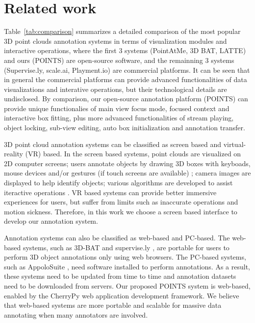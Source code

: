 \documentclass[letterpaper, 10 pt, conference]{ieeeconf}  %
\begin{document}
\section{Related work}
\label{sec:realtedwork}



Table~\ref{tab:comparison} summarizes a detailed comparison of the most popular 3D point clouds annotation systems in terms of visualization modules and interactive operations, where the first 3 systems (PointAtMe\cite{pointatme}, 3D BAT\cite{Zimmer20193DBA}, LATTE\cite{Wang2019LATTEAL}) and ours (POINTS) are open-source software, 
and the remainning 3 systems (Supervise.ly\cite{SUPERVISELY}, scale.ai\cite{scale}, Playment.io\cite{Playment}) are commercial platforms. 
It can be seen that in general the commercial platforms can provide advanced functionalities of data visualizations and interative operations, 
but their technological details are undisclosed. 
By comparison, our open-source annotation platform (POINTS) can provide unique functionalies of main view focus mode, focused context and interactive box fitting, plus more advanced functionalities of stream playing, object locking, sub-view editing, auto box initialization and annotation transfer.

3D point cloud annotation systems can be classified as screen based and virtual-reality (VR) based. 
In the screen based systems, point clouds are visualized on 2D computer screens; users annotate objects by drawing 3D boxes with
keyboads, mouse devices and/or gestures (if touch screens are available) \cite{LabelMe3D}; camera images are displayed to help identify objects; various algorithms are developed to assist iteractive operations \cite{Wang2019LATTEAL}. 
VR based systems can provide better immersive experiences for users\cite{pointatme, gothentag}, but suffer from limits such as inaccurate operations and motion sickness. 
Therefore, in this work we choose a screen based interface to develop our annotation system.

Annotation systems can also be classified as web-based and PC-based. 
The web-based systems, such as 3D-BAT\cite{Zimmer20193DBA} and supervise.ly \cite{SUPERVISELY}, are portable for users to perform 3D object annotations only using web browsers. 
The PC-based systems, such as AppoloSuite \cite{wang2019apolloscape}, need software installed to perform annotations. 
As a result, these systems need to be updated from time to time and annotation datasets need to be downloaded from servers. 
Our proposed POINTS system is web-based, enabled by the CherryPy \cite{cherrypy} web application development framework. 
We believe that web-based systems are more portable and scalable for massive data annotating when many annotators are involved.
\end{document}
